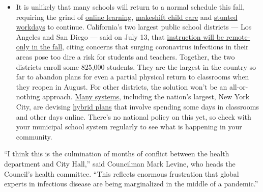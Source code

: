 \begin{itemize}
  \begin{itemize}
  \tightlist
  \item
    It is unlikely that many schools will return to a normal schedule
    this fall, requiring the grind of
    \href{https://www.nytimes3xbfgragh.onion/2020/06/05/us/coronavirus-education-lost-learning.html?action=click\&pgtype=Article\&state=default\&region=MAIN_CONTENT_3\&context=storylines_faq}{online
    learning},
    \href{https://www.nytimes3xbfgragh.onion/2020/05/29/us/coronavirus-child-care-centers.html?action=click\&pgtype=Article\&state=default\&region=MAIN_CONTENT_3\&context=storylines_faq}{makeshift
    child care} and
    \href{https://www.nytimes3xbfgragh.onion/2020/06/03/business/economy/coronavirus-working-women.html?action=click\&pgtype=Article\&state=default\&region=MAIN_CONTENT_3\&context=storylines_faq}{stunted
    workdays} to continue. California's two largest public school
    districts --- Los Angeles and San Diego --- said on July 13, that
    \href{https://www.nytimes3xbfgragh.onion/2020/07/13/us/lausd-san-diego-school-reopening.html?action=click\&pgtype=Article\&state=default\&region=MAIN_CONTENT_3\&context=storylines_faq}{instruction
    will be remote-only in the fall}, citing concerns that surging
    coronavirus infections in their areas pose too dire a risk for
    students and teachers. Together, the two districts enroll some
    825,000 students. They are the largest in the country so far to
    abandon plans for even a partial physical return to classrooms when
    they reopen in August. For other districts, the solution won't be an
    all-or-nothing approach.
    \href{https://bioethics.jhu.edu/research-and-outreach/projects/eschool-initiative/school-policy-tracker/}{Many
    systems}, including the nation's largest, New York City, are
    devising
    \href{https://www.nytimes3xbfgragh.onion/2020/06/26/us/coronavirus-schools-reopen-fall.html?action=click\&pgtype=Article\&state=default\&region=MAIN_CONTENT_3\&context=storylines_faq}{hybrid
    plans} that involve spending some days in classrooms and other days
    online. There's no national policy on this yet, so check with your
    municipal school system regularly to see what is happening in your
    community.
  \end{itemize}
\end{itemize}

``I think this is the culmination of months of conflict between the
health department and City Hall,'' said Councilman Mark Levine, who
heads the Council's health committee. ``This reflects enormous
frustration that global experts in infectious disease are being
marginalized in the middle of a pandemic.''

